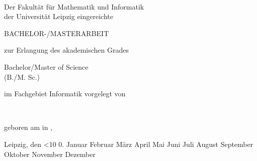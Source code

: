 
\renewcommand{\today}{\ifnum\number\day<10 0\fi \number\day.\space%
\ifcase \month \or Januar \or Februar \or März \or April \or Mai %
\or Juni \or Juli \or August \or September \or Oktober \or November \or Dezember \fi %
\number \year}

\begin{titlepage}
	\begin{addmargin}[-1cm]{-3cm}
    \begin{center}
        \large

        \hfill

        \vfill

        \begingroup
            \color{Maroon}\LARGE{\spacedallcaps{\myTitle}} \\ \bigskip
        \endgroup

        Der Fakultät für Mathematik und Informatik \\
        der Universität Leipzig eingereichte \\\vfill

        {\Huge BACHELOR-/MASTERARBEIT} \vfill\medskip

        zur Erlangung des akademischen Grades \\\vfill

        {\LARGE Bachelor/Master of Science}\\
        (B./M. Sc.)\\\vfill

        im Fachgebiet Informatik vorgelegt von\\\vfill

        \textbf{\myName} \\\vfill

        geboren am {\mybirthday} in {\mybirthtown}, {\mybirthcountry} \\\vfill

        Leipzig, den \today\vfill






%
%
%

    \end{center}
  \end{addmargin}
\end{titlepage}

